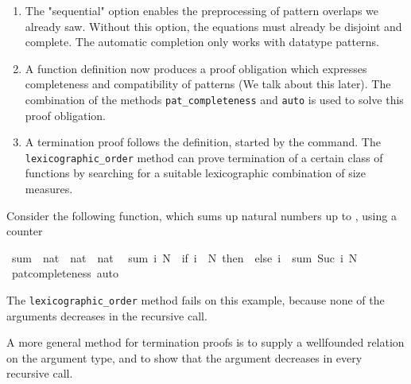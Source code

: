 \begin{isabellebody}
\begin{isamarkuptext}
  \begin{enumerate}
  \item The "sequential" option enables the preprocessing of
  pattern overlaps we already saw. Without this option, the equations
  must already be disjoint and complete. The automatic completion only
  works with datatype patterns.

  \item A function definition now produces a proof obligation which
  expresses completeness and compatibility of patterns (We talk about
  this later). The combination of the methods {\tt pat\_completeness} and
  {\tt auto} is used to solve this proof obligation.

  \item A termination proof follows the definition, started by the
   command. The {\tt lexicographic\_order} method can prove termination of a
  certain class of functions by searching for a suitable lexicographic combination of size
  measures.
  \end{enumerate}%
\end{isamarkuptext}%
\isamarkuptrue%
%
\isamarkuptrue%
%
\begin{isamarkuptext}%
Consider the following function, which sums up natural numbers up to
  , using a counter %
\end{isamarkuptext}%
\isamarkuptrue%
\isamarkupfalse%
\ sum\ {\isacharcolon}{\isacharcolon}\ {\isachardoublequoteopen}nat\ {\isasymRightarrow}\ nat\ {\isasymRightarrow}\ nat{\isachardoublequoteclose}\isanewline
{}\isanewline
\ \ {\isachardoublequoteopen}sum\ i\ N\ {\isacharequal}\ {\isacharparenleft}if\ i\ {\isachargreater}\ N\ then\ {}\ else\ i\ {\isacharplus}\ sum\ {\isacharparenleft}Suc\ i{\isacharparenright}\ N{\isacharparenright}{\isachardoublequoteclose}\isanewline
%
\isadelimproof
\ \ %
\endisadelimproof
%
\isatagproof
{}\isamarkupfalse%
\ pat{\isacharunderscore}completeness\ auto%
\endisatagproof
{\isafoldproof}%
%
\isadelimproof
%
\endisadelimproof
%
\begin{isamarkuptext}%
The {\tt lexicographic\_order} method fails on this example, because none of the
  arguments decreases in the recursive call.

  A more general method for termination proofs is to supply a wellfounded
  relation on the argument type, and to show that the argument
  decreases in every recursive call. 


\end{isamarkuptext}
\end{isabellebody}
